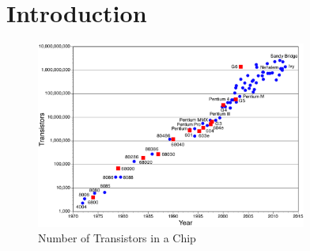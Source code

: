 \section{Introduction}

\begin{figure}[h]
 \centering
 \includegraphics[width=252pt]{images/mooreslawcurve.png}
 \caption{Number of Transistors in a Chip}
\label{fig::moore}
\end{figure}
